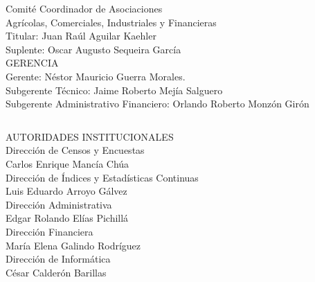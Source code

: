 \begin{center}
{\Bold Comité Coordinador de Asociaciones\\ Agrícolas, Comerciales, Industriales y Financieras}\\
Titular: Juan Raúl Aguilar Kaehler\\
Suplente:  Oscar Augusto Sequeira García\\[0.8cm]


{\Bold \large \color{color1!89!black} GERENCIA}\\[0.2cm]
Gerente: Néstor Mauricio Guerra Morales.\\
Subgerente Técnico: Jaime Roberto Mejía Salguero\\
Subgerente Administrativo Financiero: Orlando Roberto Monzón Girón\\


\end{center}

\clearpage

$\ $
\vspace{1cm}

\begin{center}
{\Bold \LARGE AUTORIDADES INSTITUCIONALES}\\[2cm]

{\Bold \large \color{color1!89!black} Dirección de Censos y Encuestas}\\[0.2cm]
Carlos Enrique Mancía Chúa\\[0.8cm]


{\Bold \large \color{color1!89!black} Dirección de Índices y Estadísticas Continuas}\\[0.2cm]
Luis Eduardo Arroyo Gálvez\\[0.8cm]

{\Bold \large \color{color1!89!black} Dirección Administrativa}\\[0.2cm]
Edgar Rolando Elías Pichillá\\[0.8cm]

{\Bold \large \color{color1!89!black} Dirección Financiera}\\[0.2cm]
María Elena Galindo Rodríguez\\[0.8cm]


{\Bold \large \color{color1!89!black} Dirección de Informática}\\[0.2cm]
César Calderón Barillas\\[0.8cm]


\end{center}\setcounter{page}{0}\cleardoublepage

\clearpage

